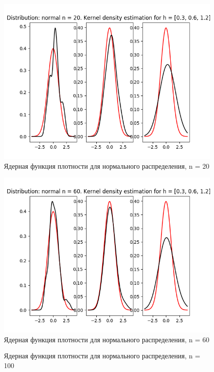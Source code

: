 \documentclass[12pt]{article}
\begin{document}
\begin{center}
    \begin{figure}[H]
 \caption{Ядерная функция плотности для нормального распределения, n = 20}
\includegraphics[width=\textwidth]{kernel/d_normal20.png}
\end{figure}
    \begin{figure}[H]
 \caption{Ядерная функция плотности для нормального распределения, n = 60}
\includegraphics[width=\textwidth]{kernel/d_normal60.png}
\end{figure}
    \begin{figure}[H]
 \caption{Ядерная функция плотности для нормального распределения, n = 100}

\end{figure}
\end{center}
\end{document}
